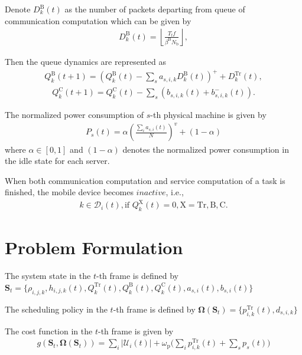 \documentclass[12pt, draftclsnofoot, onecolumn]{IEEEtran}
\begin{document}
Denote $D_{k}^{\mathrm{B}}(t)$ as the number of packets departing from queue of communication computation which can be given by
\begin{align}
	D_{k}^{\mathrm{B}}(t)=\left\lfloor\frac{T_{\mathrm{f}}f}{\beta^{\mathrm{B}}N_{\mathrm{b}}}\right\rfloor,
\end{align}

Then the queue dynamics are represented as
\begin{align}
	Q_{k}^{\mathrm{B}}(t+1)=(Q_{k}^{\mathrm{B}}(t)-\sum_{s}a_{s,i,k}D_{k}^{\mathrm{B}}(t))^{+}+D_{k}^{\mathrm{Tr}}(t),
\end{align}
\begin{align}
	Q_{k}^{\mathrm{C}}(t+1)=Q_{k}^{\mathrm{C}}(t)-\sum_{s}(b_{s,i,k}(t)+b_{s,i,k}^{-}(t)).
\end{align}

The normalized power consumption of $s$-th physical machine is given by
\begin{align}
	P_{s}(t)= \alpha\left(\frac{\sum_{i}a_{s,i}(t)}{N}\right)^{v}+(1-\alpha)
\end{align}
where $\alpha\in[0,1]$ and $(1-\alpha)$ denotes the normalized power consumption in the idle state for each server.

When both communication computation and service computation of a task is finished, the mobile device becomes $\textit{inactive}$, i.e.,
\begin{align}
	k\in\mathcal{D}_{i}(t),\text{if }Q_{k}^{\mathrm{X}}(t)=0,\mathrm{X}=\mathrm{Tr},\mathrm{B},\mathrm{C}.
\end{align}

\section{Problem Formulation}
The system state in the $t$-th frame is defined by \\
$\mathbf{S}_{t}=\{\rho_{i,j,k},h_{i,j,k}(t),Q_{k}^{\mathrm{Tr}}(t),Q_{k}^{\mathrm{B}}(t),Q_{k}^{\mathrm{C}}(t),a_{s,i}(t),b_{s,i}(t)\}$

The scheduling policy in the $t$-th frame is defined by $\mathbf{\Omega}(\mathbf{S}_{t})=\{p_{i,k}^{\mathrm{Tr}}(t),d_{s,i,k}\}$

The cost function in the $t$-th frame is given by
\begin{align}
	g(\mathbf{S}_{t},\mathbf{\Omega}(\mathbf{S}_{t}))=\sum_{i}|\mathcal{U}_{i}(t)|+\omega_{\mathrm{p}}\bigg(\sum_{i}p_{i,k}^{\mathrm{Tr}}(t)+\sum_{s}p_{s}(t)\bigg)
\end{align}
\end{document}
